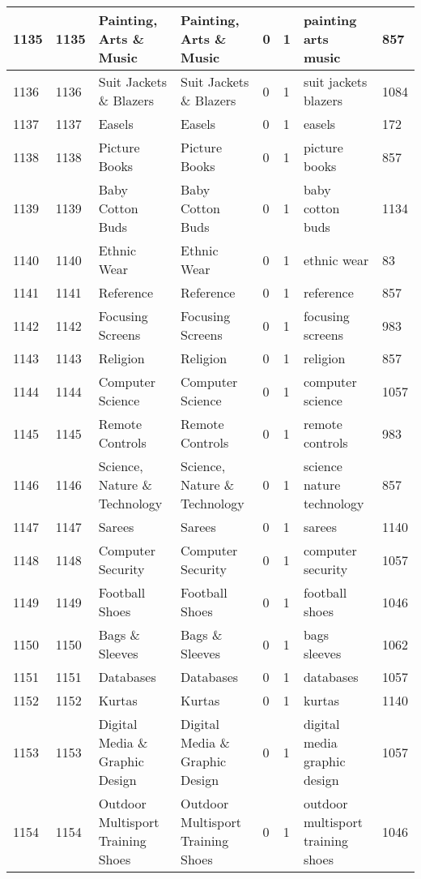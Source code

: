\begin{longtable}{|l|l|l|l|l|l|l|l|}
1135 & 1135 & Painting, Arts \& Music & Painting, Arts \& Music & 0 & 1 & painting arts music & 857 \\ \hline 
1136 & 1136 & Suit Jackets \& Blazers & Suit Jackets \& Blazers & 0 & 1 & suit jackets blazers & 1084 \\ \hline 
1137 & 1137 & Easels & Easels & 0 & 1 & easels & 172 \\ \hline 
1138 & 1138 & Picture Books & Picture Books & 0 & 1 & picture books & 857 \\ \hline 
1139 & 1139 & Baby Cotton Buds & Baby Cotton Buds & 0 & 1 & baby cotton buds & 1134 \\ \hline 
1140 & 1140 & Ethnic Wear & Ethnic Wear & 0 & 1 & ethnic wear & 83 \\ \hline 
1141 & 1141 & Reference & Reference & 0 & 1 & reference & 857 \\ \hline 
1142 & 1142 & Focusing Screens & Focusing Screens & 0 & 1 & focusing screens & 983 \\ \hline 
1143 & 1143 & Religion & Religion & 0 & 1 & religion & 857 \\ \hline 
1144 & 1144 & Computer Science & Computer Science & 0 & 1 & computer science & 1057 \\ \hline 
1145 & 1145 & Remote Controls & Remote Controls & 0 & 1 & remote controls & 983 \\ \hline 
1146 & 1146 & Science, Nature \& Technology & Science, Nature \& Technology & 0 & 1 & science nature technology & 857 \\ \hline 
1147 & 1147 & Sarees & Sarees & 0 & 1 & sarees & 1140 \\ \hline 
1148 & 1148 & Computer Security & Computer Security & 0 & 1 & computer security & 1057 \\ \hline 
1149 & 1149 & Football Shoes & Football Shoes & 0 & 1 & football shoes & 1046 \\ \hline 
1150 & 1150 & Bags \& Sleeves & Bags \& Sleeves & 0 & 1 & bags sleeves & 1062 \\ \hline 
1151 & 1151 & Databases & Databases & 0 & 1 & databases & 1057 \\ \hline 
1152 & 1152 & Kurtas & Kurtas & 0 & 1 & kurtas & 1140 \\ \hline 
1153 & 1153 & Digital Media \& Graphic Design & Digital Media \& Graphic Design & 0 & 1 & digital media graphic design & 1057 \\ \hline 
1154 & 1154 & Outdoor Multisport Training Shoes & Outdoor Multisport Training Shoes & 0 & 1 & outdoor multisport training shoes & 1046 \\ \hline 

\end{longtable}

